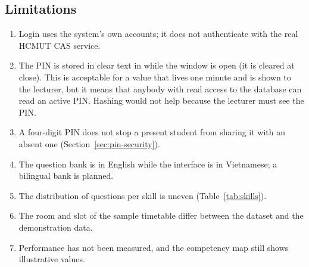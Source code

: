 \subsection{Limitations}

\begin{enumerate}
    \item Login uses the system's own accounts; it does not authenticate with the real HCMUT CAS service.
    \item The PIN is stored in clear text in  while the window is open (it is cleared at close). This is acceptable for a value that lives one minute and is shown to the lecturer, but it means that anybody with read access to the database can read an active PIN. Hashing would not help because the lecturer must see the PIN.
    \item A four-digit PIN does not stop a present student from sharing it with an absent one (Section~\ref{sec:pin-security}).
    \item The question bank is in English while the interface is in Vietnamese; a bilingual bank is planned.
    \item The distribution of questions per skill is uneven (Table~\ref{tab:skills}).
    \item The room and slot of the sample timetable differ between the dataset and the demonstration data.
    \item Performance has not been measured, and the competency map still shows illustrative values.
\end{enumerate}
